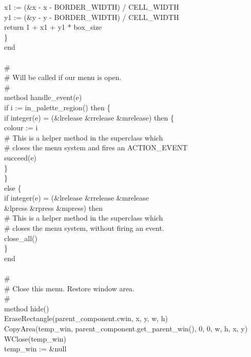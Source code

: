 {\>\>\>x1 := (\&x - x - BORDER\_WIDTH) / CELL\_WIDTH \\
\>\>\>y1 := (\&y - y - BORDER\_WIDTH) / CELL\_WIDTH \\
\>\>\>return 1 + x1 + y1 * box\_size \\
\>\>\>\} \\
\>end \\
\ \\
\>\# \\
\>\# Will be called if our menu is open. \\
\>\# \\
\>method handle\_event(e) \\
\>\>if i := in\_palette\_region() then \{ \\
\>\>\>if integer(e) = (\&lrelease {\textbar} \&rrelease {\textbar} \&mrelease) then \{ \\
\>\>\>\>colour := i \\
\>\>\>\>\# This is a helper method in the superclass which \\
\>\>\>\>\# closes the menu system and fires an ACTION\_EVENT \\
\>\>\>\>succeed(e) \\
\>\>\>\>\} \\
\>\>\>\} \\
\>\>else \{ \\
\>\>\>if integer(e) = (\&lrelease {\textbar} \&rrelease {\textbar} \&mrelease {\textbar} \\
\>\>\>\>\>\>\>\&lpress {\textbar} \&rpress {\textbar} \&mpress) then \\
\>\>\>\>\# This is a helper method in the superclass which \\
\>\>\>\>\# closes the menu system, without firing an event. \\
\>\>\>\>close\_all() \\
\>\>\>\} \\
\>end \\
\ \\
\>\# \\
\>\# Close this menu. Restore window area. \\
\>\# \\
\>method hide() \\
\>\>EraseRectangle(parent\_component.cwin, x, y, w, h) \\
\>\>CopyArea(temp\_win, parent\_component.get\_parent\_win(), 0, 0, w, h, x, y) \\
\>\>WClose(temp\_win) \\
\>\>temp\_win := \&null \\
}
